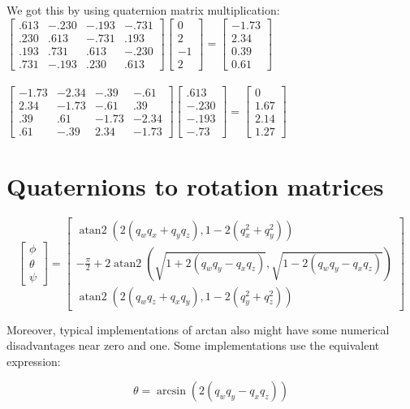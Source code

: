 \documentclass{article}
\begin{document}
We got this by using quaternion matrix multiplication:\\
$\begin{bmatrix}
.613 & -.230 & -.193 & -.731\\
.230 & .613 & -.731 & .193\\
 .193 & .731 & .613 & -.230\\
 .731 & -.193 &  .230 & .613 
\end{bmatrix}\begin{bmatrix}
0\\
2\\
-1\\
2
\end{bmatrix}=\begin{bmatrix}
-1.73\\
2.34\\
0.39\\
0.61
\end{bmatrix}$\\\\
$\begin{bmatrix}
-1.73 & -2.34 & -.39 & -.61\\
2.34 & -1.73 & -.61 & .39\\
 .39 & .61 &  -1.73 & -2.34\\
 .61 & -.39 &  2.34 & -1.73 
\end{bmatrix}\begin{bmatrix}
.613\\
-.230\\
-.193\\
-.73
\end{bmatrix}=\begin{bmatrix}
0\\
1.67\\
2.14\\
1.27
\end{bmatrix}$

\section{Quaternions to rotation matrices}
\[
\begin{bmatrix}
\phi \\[4pt]
\theta \\[4pt]
\psi
\end{bmatrix}
=
\begin{bmatrix}
\operatorname{atan2}
\left(
2(q_w q_x + q_y q_z),
1 - 2(q_x^2 + q_y^2)
\right)
\\[10pt]

-\frac{\pi}{2}
+
2\operatorname{atan2}
\left(
\sqrt{1 + 2(q_w q_y - q_x q_z)},
\sqrt{1 - 2(q_w q_y - q_x q_z)}
\right)
\\[10pt]

\operatorname{atan2}
\left(
2(q_w q_z + q_x q_y),
1 - 2(q_y^2 + q_z^2)
\right)
\end{bmatrix}
\]

Moreover, typical implementations of arctan also might have some
numerical disadvantages near zero and one. Some implementations use
the equivalent expression:

\[
\theta
=
\arcsin\left(
2(q_w q_y - q_x q_z)
\right)
\]
\end{document}
